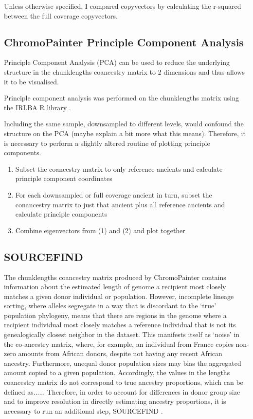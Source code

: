 Unless otherwise specified, I compared copyvectors by calculating the r-squared between the full coverage copyvectors.

\subsection{ChromoPainter Principle Component Analysis}

Principle Component Analysis (PCA) can be used to reduce the underlying structure in the chunklengths coancestry matrix to 2 dimensions and thus allows it to be visualised. 

Principle component analysis was performed on the chunklengths matrix using the IRLBA R library \cite{baglama2005augmented}.

Including the same sample, downsampled to different levels, would confound the structure on the PCA (maybe explain a bit more what this means). Therefore, it is necessary to perform a slightly altered routine of plotting principle components. 

\begin{enumerate}
\item Subset the coancestry matrix to only reference ancients and calculate principle component coordinates
\item For each downsampled or full coverage ancient in turn, subset the conancestry matrix to just that ancient plus all reference ancients and calculate principle components
\item Combine eigenvectors from (1) and (2) and plot together
\end{enumerate}

\subsection{SOURCEFIND}

The chunklengths coancestry matrix produced by ChromoPainter contains information about the estimated length of genome a recipient most closely matches a given donor individual or population. However, incomplete lineage sorting, where alleles segregate in a way that is discordant to the `true' population phylogeny, means that there are regions in the genome where a recipient individual most closely matches a reference individual that is not its genealogically closest neighbor in the dataset. This manifests itself as `noise' in the co-ancestry matrix, where, for example, an individual from France copies non-zero amounts from African donors, despite not having any recent African ancestry.  Furthermore, unequal donor population sizes may bias the aggregated amount copied to a given population. Accordingly, the values in the lengths coancestry matrix do not correspond to true ancestry proportions, which can be defined as...... Therefore, in order to account for differences in donor group size and to improve resolution in directly estimating ancestry proportions, it is necessary to run an additional step, SOURCEFIND \cite{Chacon-Duque2018}.

